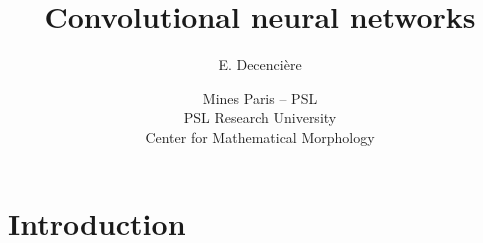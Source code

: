 \documentclass[xcolor=pdftex,dvipsnames,table,mathserif]{beamer}
\title{Convolutional neural networks}
\author{E. Decencière}
\date{Mines Paris -- PSL\\
  PSL Research University\\
  Center for Mathematical Morphology
}
\begin{document}
\begin{frame}
  \titlepage
\end{frame}






\section{Introduction}
\end{document}
